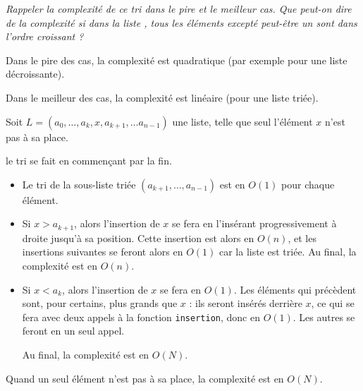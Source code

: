 \begin{Exercise}\it
Rappeler la complexité de ce tri dans le pire et le meilleur cas. Que
peut-on dire de la complexité si dans la liste , tous les
éléments excepté peut-être un sont dans l’ordre croissant ?
\end{Exercise}
\begin{Answer}
Dans le pire des cas, la complexité est quadratique (par exemple pour une liste décroissante). 

Dans le meilleur des cas, la complexité est linéaire (pour une liste triée). 

Soit $L = (a_0, \dots, a_k, x, a_{k+1}, \dots a_{n-1})$ une liste, telle que seul l'élément $x$ n'est pas à sa place. 

le tri se fait en commençant par la fin.

\begin{itemize} 
    \item Le tri de la sous-liste triée $(a_{k+1}, \dots,  a_{n-1})$ est en $O(1)$ pour chaque élément.
    \item Si $x > a_{k+1}$, alors l'insertion de $x$ se fera en l'insérant progressivement à droite jusqu'à sa position. Cette insertion est alors en $O(n)$, et les insertions suivantes se feront alors en $O(1)$ car la liste est triée. Au final, la complexité est en $O(n)$. 
    \item Si $x < a_k$, alors l'insertion de $x$ se fera en $O(1)$. Les éléments qui précèdent sont, pour certains, plus grands que $x$ : ils seront insérés derrière $x$, ce qui se fera avec deux appels à la fonction \texttt{insertion}, donc en $O(1)$. Les autres se feront en un seul appel. 
    
    Au final, la complexité est en $O(N)$.
\end{itemize} 

Quand un seul élément n'est pas à sa place, la complexité est en $O(N)$.
\end{Answer}
